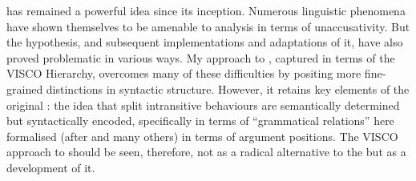\documentclass[output=paper]{langsci/langscibook}
\begin{document}
  has remained a powerful
idea since its inception. Numerous linguistic phenomena have shown themselves
to be amenable to analysis in terms of unaccusativity. But the hypothesis, and
subsequent implementations and adaptations of it, have also proved problematic
in various ways. My approach to , captured in terms
of the VISCO Hierarchy, overcomes many of these difficulties by positing more
fine-grained distinctions in syntactic structure. However, it retains key
elements of the original : the idea that split
intransitive behaviours are semantically determined but syntactically encoded,
specifically in terms of \enquote{grammatical relations} here formalised (after
\citealt{Burzio1986} and many others) in terms of argument positions. The VISCO
approach to  should be seen, therefore, not as a
radical alternative to the  but as a development
of it.

\printchapterglossary{}

{\sloppy
\printbibliography[heading=subbibliography,notkeyword=this]
}
\end{document}
